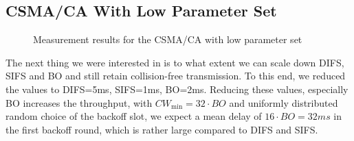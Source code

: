 \subsection{CSMA/CA With Low Parameter Set}
\label{sec:csma-dbl-low}

\begin{figure}[b]
	\label{fig:results-csma-low-dbl-1}
	\begin{center}
		\centerline{
		}	
	\end{center}
	\caption{Measurement results for the CSMA/CA with low parameter set}
\end{figure}

The next thing we were interested in is to what extent we can scale down DIFS, SIFS and BO and still retain collision-free transmission. To this end, we reduced the values to DIFS=5ms, SIFS=1ms, BO=2ms. Reducing these values, especially BO increases the throughput, with $CW_\text{min} = 32 \cdot BO$ and uniformly distributed random choice of the backoff slot, we expect a mean delay of $16\cdot BO=32ms$ in the first backoff round, which is rather large compared to DIFS and SIFS.

